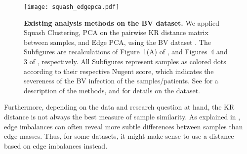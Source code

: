 \begin{figure}[!htb]
    \centering
    \texttt{[image: squash\_edgepca.pdf]}
    \begin{subfigure}{0pt}
        \label{fig:squash_edgepca:sub:squash}
    \end{subfigure}
    \begin{subfigure}{0pt}
        \label{fig:squash_edgepca:sub:pca}
    \end{subfigure}
    \begin{subfigure}{0pt}
        \label{fig:squash_edgepca:sub:epca}
    \end{subfigure}
    \caption[Existing analysis methods on the BV dataset]{
        \textbf{Existing analysis methods on the BV dataset.}
        We applied  Squash Clustering,
         PCA on the pairwise KR distance matrix between samples,
        and  Edge PCA,
        using the \acf{BV} dataset \cite{Srinivasan2012}.
        The Subfigures are recalculations of Figure~1(A) of ,
        and Figures~4 and 3 of , respectively.
        All Subfigures represent samples as colored dots according to their respective Nugent score,
        which indicates the severeness of the \ac{BV} infection of the samples/patients.
        See  for a description of the methods,
        and  for details on the dataset.
    }
    \label{fig:squash_edgepca}
\end{figure}

Furthermore, depending on the data and research question at hand,
the KR distance is not always the best measure of sample similarity.
As explained in ,
edge imbalances can often reveal more subtle differences between samples than edge masses.
Thus, for some datasets, it might make sense to use a distance based on edge imbalances instead.

